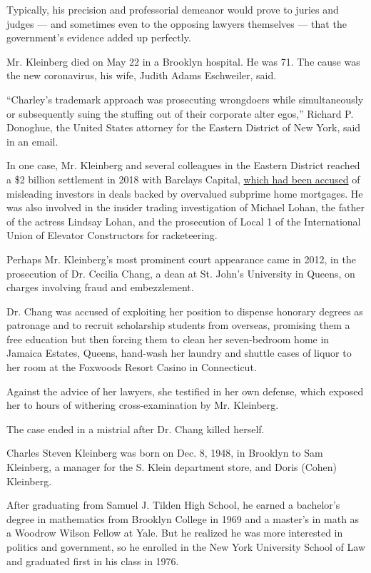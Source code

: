 Typically, his precision and professorial demeanor would prove to juries
and judges --- and sometimes even to the opposing lawyers themselves ---
that the government's evidence added up perfectly.

Mr. Kleinberg died on May 22 in a Brooklyn hospital. He was 71. The
cause was the new coronavirus, his wife, Judith Adams Eschweiler, said.

``Charley's trademark approach was prosecuting wrongdoers while
simultaneously or subsequently suing the stuffing out of their corporate
alter egos,'' Richard P. Donoghue, the United States attorney for the
Eastern District of New York, said in an email.

In one case, Mr. Kleinberg and several colleagues in the Eastern
District reached a \$2 billion settlement in 2018 with Barclays Capital,
\href{https://www.nytimes.com/2016/12/22/business/dealbook/justice-department-sues-barclays-mortgage-backed-securities.html}{which
had been accused} of misleading investors in deals backed by overvalued
subprime home mortgages. He was also involved in the insider trading
investigation of Michael Lohan, the father of the actress Lindsay Lohan,
and the prosecution of Local 1 of the International Union of Elevator
Constructors for racketeering.

Perhaps Mr. Kleinberg's most prominent court appearance came in 2012, in
the prosecution of Dr. Cecilia Chang, a dean at St. John's University in
Queens, on charges involving fraud and embezzlement.

Dr. Chang was accused of exploiting her position to dispense honorary
degrees as patronage and to recruit scholarship students from overseas,
promising them a free education but then forcing them to clean her
seven-bedroom home in Jamaica Estates, Queens, hand-wash her laundry and
shuttle cases of liquor to her room at the Foxwoods Resort Casino in
Connecticut.

Against the advice of her lawyers, she testified in her own defense,
which exposed her to hours of withering cross-examination by Mr.
Kleinberg.

The case ended in a mistrial after Dr. Chang killed herself.

Charles Steven Kleinberg was born on Dec. 8, 1948, in Brooklyn to Sam
Kleinberg, a manager for the S. Klein department store, and Doris
(Cohen) Kleinberg.

After graduating from Samuel J. Tilden High School, he earned a
bachelor's degree in mathematics from Brooklyn College in 1969 and a
master's in math as a Woodrow Wilson Fellow at Yale. But he realized he
was more interested in politics and government, so he enrolled in the
New York University School of Law and graduated first in his class in
1976.

